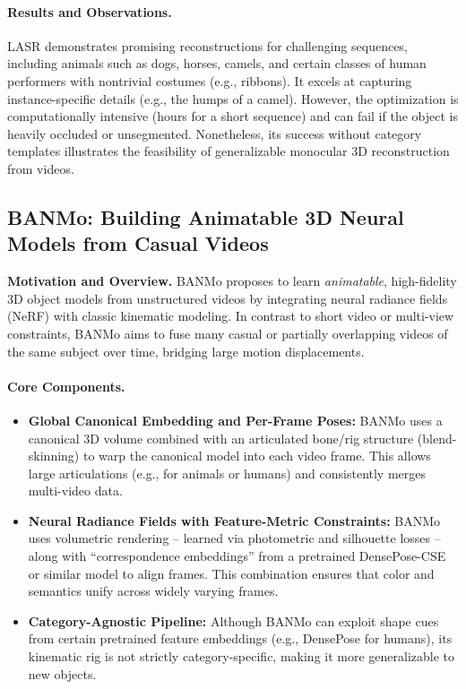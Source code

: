 \documentclass[11pt]{article}
\begin{document}
\paragraph{Results and Observations.}
LASR demonstrates promising reconstructions for challenging sequences, including animals such as dogs, horses, camels, and certain classes of human performers with nontrivial costumes (e.g., ribbons). It excels at capturing instance-specific details (e.g., the humps of a camel). However, the optimization is computationally intensive (hours for a short sequence) and can fail if the object is heavily occluded or unsegmented. Nonetheless, its success without category templates illustrates the feasibility of generalizable monocular 3D reconstruction from videos.

\subsection{BANMo: Building Animatable 3D Neural Models from Casual Videos}
\label{subsec:banmo}
\textbf{Motivation and Overview.}
BANMo proposes to learn \emph{animatable}, high-fidelity 3D object models from unstructured videos by integrating neural radiance fields (NeRF) with classic kinematic modeling. In contrast to short video or multi-view constraints, BANMo aims to fuse many casual or partially overlapping videos of the same subject over time, bridging large motion displacements.

\paragraph{Core Components.}
\begin{itemize}
    \item \textbf{Global Canonical Embedding and Per-Frame Poses:} BANMo uses a canonical 3D volume combined with an articulated bone/rig structure (blend-skinning) to warp the canonical model into each video frame. This allows large articulations (e.g., for animals or humans) and consistently merges multi-video data.
    \item \textbf{Neural Radiance Fields with Feature-Metric Constraints:} BANMo uses volumetric rendering – learned via photometric and silhouette losses – along with “correspondence embeddings” from a pretrained DensePose-CSE or similar model to align frames. This combination ensures that color and semantics unify across widely varying frames.
    \item \textbf{Category-Agnostic Pipeline:} Although BANMo can exploit shape cues from certain pretrained feature embeddings (e.g., DensePose for humans), its kinematic rig is not strictly category-specific, making it more generalizable to new objects.
\end{itemize}
\end{document}
